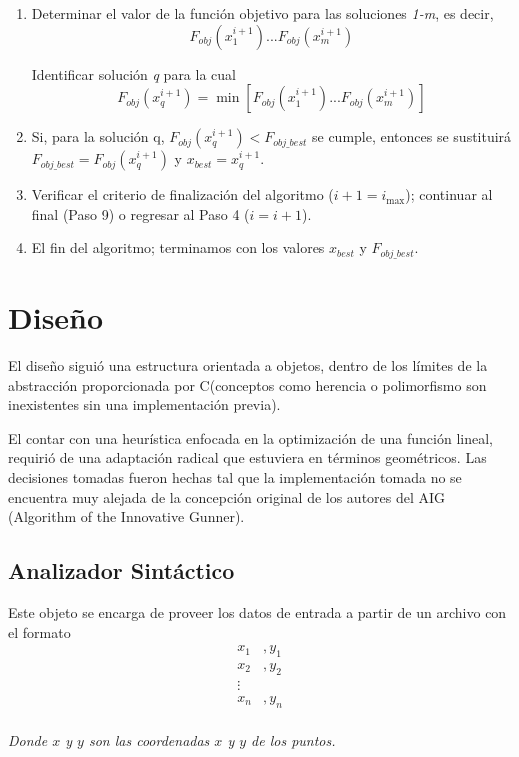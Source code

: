 \documentclass[a4paper]{report}
\begin{document}
\begin{enumerate}
  \item Determinar el valor de la funci\'on objetivo para las soluciones \textit{1-m}, es decir,
    \[F_{obj}(x_1^{i+1})...F_{obj}(x_m^{i+1})\]

    Identificar soluci\'on \textit{q} para la cual
    \[F_{obj}(x_q^{i+1}) = \min[F_{obj}(x_1^{i+1})... F_{obj}(x_m^{i+1})]\]

  \item Si, para la soluci\'on q, $F_{obj}(x_q^{i+1}) < F_{obj\_best}$ se cumple, entonces
    se sustituir\'a $F_{obj\_best} = F_{obj}(x_q^{i+1})$ y $x_{best} = x_q^{i+1}$.
  \item Verificar el criterio de finalizaci\'on del algoritmo ($i+1 = i_{\max}$); continuar al
    final (Paso 9) o regresar al Paso 4 ($i = i+1$).
  \item El fin del algoritmo; terminamos con los valores $x_{best}$ y $F_{obj\_best}$.
  \end{enumerate}

  \chapter{Dise\~no}
  El dise\~no sigui\'o una estructura orientada a objetos, dentro de los l\'imites de la
  abstracci\'on proporcionada por C(conceptos como herencia o polimorfismo son inexistentes
  sin una implementaci\'on previa).

  El contar con una heur\'istica enfocada en la optimizaci\'on de una funci\'on lineal,
  requiri\'o de una adaptaci\'on radical que estuviera en t\'erminos geom\'etricos.
  Las decisiones tomadas fueron hechas tal que la implementaci\'on tomada no se encuentra
  muy alejada de la concepci\'on original de los autores del AIG (Algorithm of the Innovative
  Gunner).

  \section{Analizador Sint\'actico}
  Este objeto se encarga de proveer los datos de entrada a partir de un archivo con el formato
  \begin{align*}
    x_1&,y_1\\
    x_2&,y_2\\
    \vdots\\
    x_n&,y_n\\
  \end{align*}
  \begin{center}
    \tiny{\textit{Donde $x$ y $y$ son las coordenadas $x$ y $y$ de los puntos.}}
  \end{center}
\end{document}
